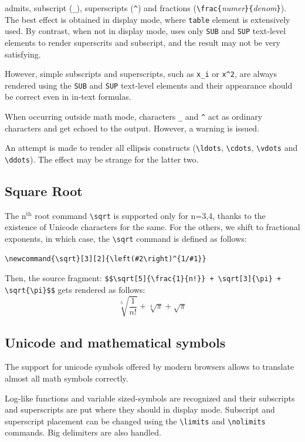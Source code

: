 \hevea{} admits, subscript (\verb+_+), superscripts (\verb+^+) and
fractions (\verb+\frac{+{\it numer}\verb+}{+{\it denom}\verb+}+).
The best effect is obtained in display mode, where \html{}
\verb+table+ element is extensively used.
By contrast, when not in display mode, \hevea{} uses only
\verb+SUB+ and \verb+SUP+ text-level elements to render superscrits
and subscript, and the result may not be very satisfying.

However,
simple subscripts and superscripts, such as \verb+x_i+ or \verb+x^2+,
are always rendered using the \verb+SUB+
and \verb+SUP+ text-level elements and their appearance should be correct
even in in-text formulas.

When occurring outside math mode, characters \verb+_+ and \verb+^+ act as
ordinary characters and get echoed to the output. However, a warning
is issued.

An attempt is made to render all ellipsis constructs (\verb+\ldots+,
\verb+\cdots+, \verb+\vdots+ and \verb+\ddots+). The effect may be
strange for the latter two.

\subsection{Square Root}
\index{\verb+\sqrt+}
The n$^{\mbox{th}}$ root command \verb+\sqrt+ is supported only for n=3,4, thanks to the existence of Unicode characters for the same. For the others, we shift to fractional exponents, in which case, the \verb+\sqrt+ command is
defined as follows:
\begin{verbatim}
\newcommand{\sqrt}[3][2]{\left(#2\right)^{1/#1}}
\end{verbatim}
\begin{htmlonly}
Then, the source
fragment: \verb"$$\sqrt[5]{\frac{1}{n!}} + \sqrt[3]{\pi} + \sqrt{\pi}$$" gets rendered
as follows:
$$
\sqrt[5]{\frac{1}{n!}} + \sqrt[3]{\pi} + \sqrt{\pi}
$$
\end{htmlonly}

\subsection{Unicode and mathematical symbols}

The support for unicode symbols offered by modern browsers allows to
translate almost all math symbols correctly.

Log-like functions and variable sized-symbols are recognized and their
subscripts and superscripts are put where they should in display mode.
Subscript and superscript placement can be changed using the
\verb+\limits+ and \verb+\nolimits+ commands.
Big delimiters are also handled.

